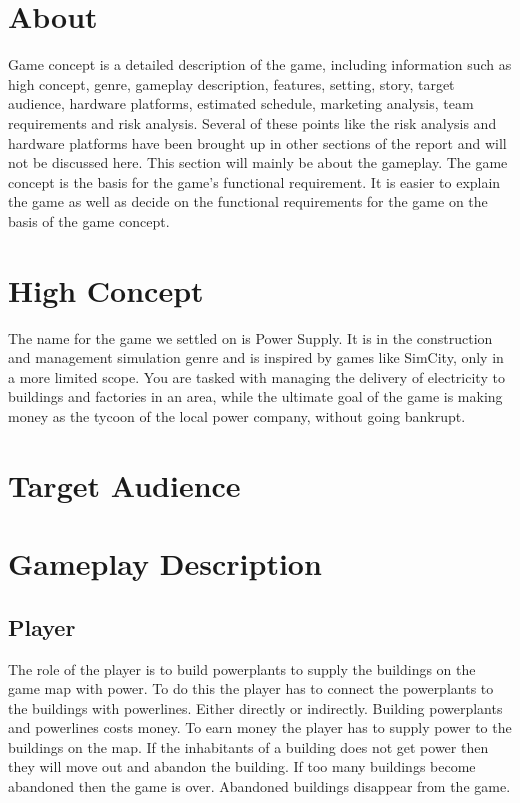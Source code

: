  \section{About}
    Game concept is a detailed description of the game, including information such as high concept, genre,
    gameplay description, features, setting, story, target audience, hardware platforms, estimated schedule,
    marketing analysis, team requirements and risk analysis. \cite{gameConcept}
    Several of these points like the risk analysis and hardware platforms have been brought up in other 
    sections of the report and will not be discussed here. This section will mainly be about the gameplay. 
    The game concept is the basis for the game's functional requirement. It is easier to explain the game 
    as well as decide on the functional requirements for the game on the basis of the game concept. 

\section{High Concept}
    The name for the game we settled on is Power Supply. It is in the construction and management 
    simulation genre and is inspired by games like SimCity, only in a more limited scope. You are 
    tasked with managing the delivery of electricity to buildings and factories in an area, while the 
    ultimate goal of the game is making money as the tycoon of the local power company, without going 
    bankrupt.

\section{Target Audience}

\section{Gameplay Description}

\subsection*{Player}
    The role of the player is to build powerplants to supply the buildings on the game map with power. 
    To do this the player has to connect the powerplants to the buildings with powerlines. Either directly
    or indirectly. Building powerplants and powerlines costs money. To earn money the player has to supply
    power to the buildings on the map. If the inhabitants of a building does not get power then they will
    move out and abandon the building. If too many buildings become abandoned then the game is over.
    Abandoned buildings disappear from the game.

